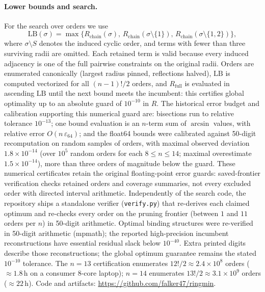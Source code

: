 \documentclass[11pt]{article}
\theoremstyle{definition}
\theoremstyle{remark}
\begin{document}
\paragraph{Lower bounds and search.} For the search over orders we use
\[
\mathrm{LB}(\sigma)=\max\big\{R_{\mathrm{chain}}(\sigma),\,R_{\mathrm{chain}}(\sigma\setminus\{1\}),\,R_{\mathrm{chain}}(\sigma\setminus\{1,2\})\big\},
\]
where $\sigma\setminus S$ denotes the induced cyclic order, and terms with fewer than three surviving radii are omitted. Each retained term is valid because every induced adjacency is one of the full pairwise constraints on the original radii. Orders are enumerated canonically (largest radius pinned, reflections halved), $\mathrm{LB}$ is computed vectorized for all $(n-1)!/2$ orders, and $R_{\mathrm{full}}$ is evaluated in ascending $\mathrm{LB}$ until the next bound meets the incumbent: this certifies global optimality up to an absolute guard of $10^{-10}$ in $R$. The historical error budget and calibration supporting this numerical guard are: bisections run to relative tolerance $10^{-13}$; one bound evaluation is an $n$-term sum of $\arcsin$ values, with relative error $O(n\,\varepsilon_{64})$; and the float64 bounds were calibrated against 50-digit recomputation on random samples of orders, with maximal observed deviation $1.8\times10^{-14}$ (over $10^5$ random orders for each $8\le n\le14$; maximal overestimate $1.5\times10^{-14}$), more than three orders of magnitude below the guard. These numerical certificates retain the original floating-point error guards: saved-frontier verification checks retained orders and coverage summaries, not every excluded order with directed interval arithmetic. Independently of the search code, the repository ships a standalone verifier (\texttt{verify.py}) that re-derives each claimed optimum and re-checks every order on the pruning frontier (between $1$ and $11$ orders per $n$) in 50-digit arithmetic. Optimal binding structures were re-verified in 50-digit arithmetic (mpmath); the reported high-precision incumbent reconstructions have essential residual slack below $10^{-40}$. Extra printed digits describe those reconstructions; the global optimum guarantee remains the stated $10^{-10}$ tolerance. The $n=13$ certification enumerates $12!/2\approx2.4\times10^8$ orders ($\approx1.8$\,h on a consumer 8-core laptop); $n=14$ enumerates $13!/2\approx3.1\times10^9$ orders ($\approx22$\,h). Code and artifacts: \url{https://github.com/falker47/ringmin}.
\end{document}
